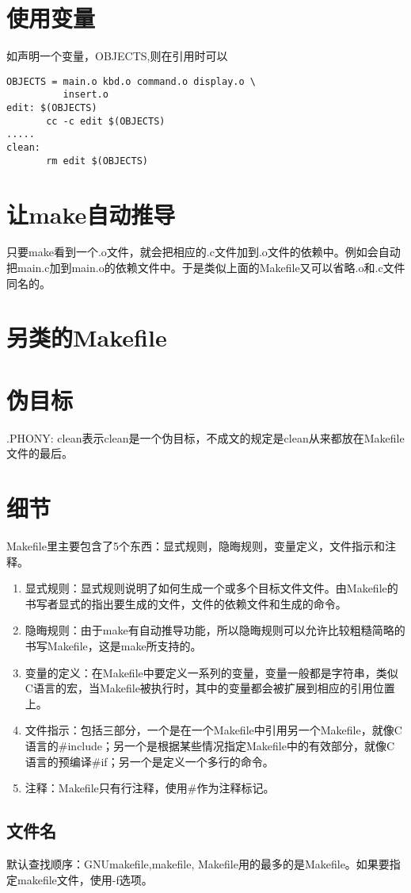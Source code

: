 \documentclass{article}
\begin{document}
\section{使用变量}
如声明一个变量，OBJECTS,则在引用时可以
\begin{verbatim}
OBJECTS = main.o kbd.o command.o display.o \
          insert.o
edit: $(OBJECTS)
	   cc -c edit $(OBJECTS)
.....
clean:
	   rm edit $(OBJECTS)
\end{verbatim}
\section{让make自动推导}
只要make看到一个.o文件，就会把相应的.c文件加到.o文件的依赖中。例如会自动把main.c加到main.o的依赖文件中。于是类似上面的Makefile又可以省略.o和.c文件同名的。
\section{另类的Makefile}

\section{伪目标}
.PHONY: clean表示clean是一个伪目标，不成文的规定是clean从来都放在Makefile文件的最后。
\section{细节}
Makefile里主要包含了5个东西：显式规则，隐晦规则，变量定义，文件指示和注释。
\begin{enumerate}
\item  显式规则：显式规则说明了如何生成一个或多个目标文件文件。由Makefile的书写者显式的指出要生成的文件，文件的依赖文件和生成的命令。
\item  隐晦规则：由于make有自动推导功能，所以隐晦规则可以允许比较粗糙简略的书写Makefile，这是make所支持的。
\item  变量的定义：在Makefile中要定义一系列的变量，变量一般都是字符串，类似C语言的宏，当Makefile被执行时，其中的变量都会被扩展到相应的引用位置上。
\item  文件指示：包括三部分，一个是在一个Makefile中引用另一个Makefile，就像C语言的\#include；另一个是根据某些情况指定Makefile中的有效部分，就像C语言的预编译\#if；另一个是定义一个多行的命令。
\item  注释：Makefile只有行注释，使用\#作为注释标记。
\end{enumerate}
\subsection{文件名}
默认查找顺序：GNUmakefile,makefile, Makefile用的最多的是Makefile。如果要指定makefile文件，使用-f选项。
\end{document}
